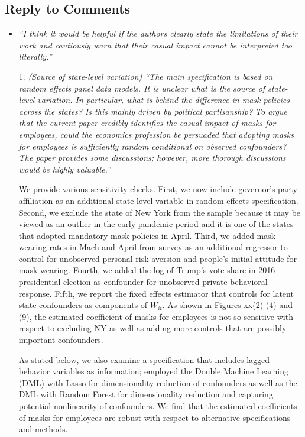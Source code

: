 \documentclass[11pt]{article}
\begin{document}
\subsection*{Reply to Comments}
\begin{itemize}

\item  \textit{``I think it would be helpful if the authors clearly state the limitations of their work and
cautiously warn that their casual impact cannot be interpreted too literally.''}
 
  
\item[1.]   \textit{(Source of state-level variation) ``The main specification is based on random effects panel data
models. It is unclear what is the source of state-level variation. In particular, what is behind
the difference in mask policies across the states? Is this mainly driven by political partisanship?
To argue that the current paper credibly identifies the casual impact of masks for
employees, could the economics profession be persuaded that adopting masks for employees
is sufficiently random conditional on observed confounders? The paper provides some
discussions; however, more thorough discussions would be highly valuable.''}
  
We provide various sensitivity checks. First, we now include governor's party affiliation as an additional state-level variable in random effects specification. 
Second, we exclude the state of New York from the sample because it may be viewed as an
outlier in the early pandemic period and it is  one of the states that adopted mandatory mask policies in April. Third, we added mask wearing rates in Mach and April from survey as an additional regressor to control for unobserved personal risk-aversion and people's initial attitude for mask wearing. Fourth,  we added the log of Trump's vote share in 2016 presidential election as confounder for
unobserved private behavioral response. Fifth, we report the fixed effects estimator that controls for latent state confounders as components of $W_{it}$.  
As shown in Figures xx(2)-(4) and (9), the estimated coefficient of masks for employees is not so sensitive with respect to excluding NY as well as adding more controls that are possibly important confounders.  

As stated below, we also examine a specification that includes lagged behavior variables as information; employed the Double Machine Learning (DML) with Lasso for dimensionality reduction of confounders as well as the DML with Random Forest for dimensionality reduction and capturing potential nonlinearity of confounders. We find that the estimated coefficients of masks for employees are robust with respect to alternative specifications and methods.
  

\end{itemize}
\end{document}
